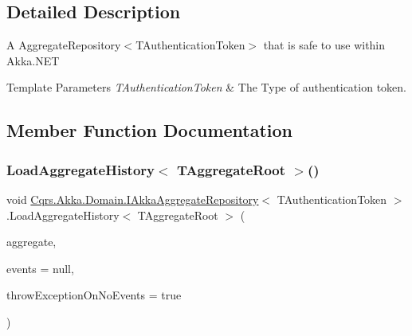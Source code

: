 \subsection{Detailed Description}
A Aggregate\+Repository$<$\+T\+Authentication\+Token$>$ that is safe to use within Akka.\+N\+ET 


\begin{DoxyTemplParams}{Template Parameters}
{\em T\+Authentication\+Token} & The Type of authentication token.\\
\hline
\end{DoxyTemplParams}


\subsection{Member Function Documentation}
\mbox{\label{interfaceCqrs_1_1Akka_1_1Domain_1_1IAkkaAggregateRepository_a9010b259daf5d09f7269277361015ddf_a9010b259daf5d09f7269277361015ddf}} 
\subsubsection{\texorpdfstring{Load\+Aggregate\+History$<$ T\+Aggregate\+Root $>$()}{LoadAggregateHistory< TAggregateRoot >()}}
{\footnotesize\ttfamily void \hyperlink{interfaceCqrs_1_1Akka_1_1Domain_1_1IAkkaAggregateRepository}{Cqrs.\+Akka.\+Domain.\+I\+Akka\+Aggregate\+Repository}$<$ T\+Authentication\+Token $>$.Load\+Aggregate\+History$<$ T\+Aggregate\+Root $>$ (\begin{DoxyParamCaption}\item[{T\+Aggregate\+Root}]{aggregate,  }\item[{I\+List$<$ \hyperlink{interfaceCqrs_1_1Events_1_1IEvent}{I\+Event}$<$ T\+Authentication\+Token $>$$>$}]{events = {\ttfamily null},  }\item[{bool}]{throw\+Exception\+On\+No\+Events = {\ttfamily true} }\end{DoxyParamCaption})}



